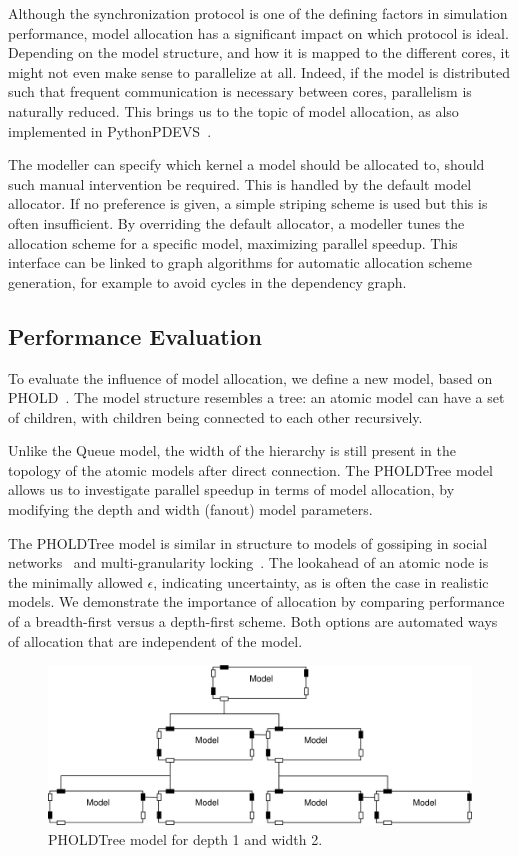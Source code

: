 Although the synchronization protocol is one of the defining factors in simulation performance, model allocation has a significant impact on which protocol is ideal.
Depending on the model structure, and how it is mapped to the different cores, it might not even make sense to parallelize at all.
Indeed, if the model is distributed such that frequent communication is necessary between cores, parallelism is naturally reduced.
This brings us to the topic of model allocation, as also implemented in PythonPDEVS~\cite{PythonPDEVS2}.

The modeller can specify which kernel a model should be allocated to, should such manual intervention be required.
This is handled by the default model allocator.
If no preference is given, a simple striping scheme is used but this is often insufficient.
By overriding the default allocator, a modeller tunes the allocation scheme for a specific model, maximizing parallel speedup.
This interface can be linked to graph algorithms for automatic allocation scheme generation, for example to avoid cycles in the dependency graph.

\subsection{Performance Evaluation}
To evaluate the influence of model allocation, we define a new model, based on PHOLD~\cite{PHOLD}.
The model structure resembles a tree: an atomic model can have a set of children, with children being connected to each other recursively.

Unlike the Queue model, the width of the hierarchy is still present in the topology of the atomic models after direct connection.
The PHOLDTree model allows us to investigate parallel speedup in terms of model allocation, by modifying the depth and width (fanout) model parameters.

The PHOLDTree model is similar in structure to models of gossiping in social networks~\cite{Gossip} and multi-granularity locking~\cite{MultiGranularityLocking}.
The lookahead of an atomic node is the minimally allowed $\epsilon$, indicating uncertainty, as is often the case in realistic models.
We demonstrate the importance of allocation by comparing performance of a breadth-first versus a depth-first scheme.
Both options are automated ways of allocation that are independent of the model.

\begin{figure}
    \center
    \includegraphics[width=\columnwidth]{fig/pholdtree.pdf}
    \caption{PHOLDTree model for depth 1 and width 2.}
    \label{fig:PHOLDTree_model}
\end{figure}

